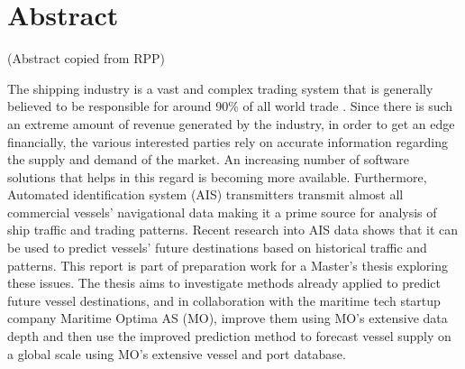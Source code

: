 \chapter*{Abstract}

(Abstract copied from RPP)

The shipping industry is a vast and complex trading system that is generally believed to be responsible for around 90\% of all world trade \parencite{GROTE2016511}. Since there is such an extreme amount of revenue generated by the industry, in order to get an edge financially, the various interested parties rely on accurate information regarding the supply and demand of the market. An increasing number of software solutions that helps in this regard is becoming more available. Furthermore, Automated identification system (AIS) transmitters transmit almost all commercial vessels’ navigational data making it a prime source for analysis of ship traffic and trading patterns. Recent research into AIS data shows that it can be used to predict vessels’ future destinations based on historical traffic and patterns. This report is part of preparation work for a Master’s thesis exploring these issues. The thesis aims to investigate methods already applied to predict future vessel destinations, and in collaboration with the maritime tech startup company Maritime Optima AS (MO), improve them using MO’s extensive data depth and then use the improved prediction method to forecast vessel supply on a global scale using MO’s extensive vessel and port database.
